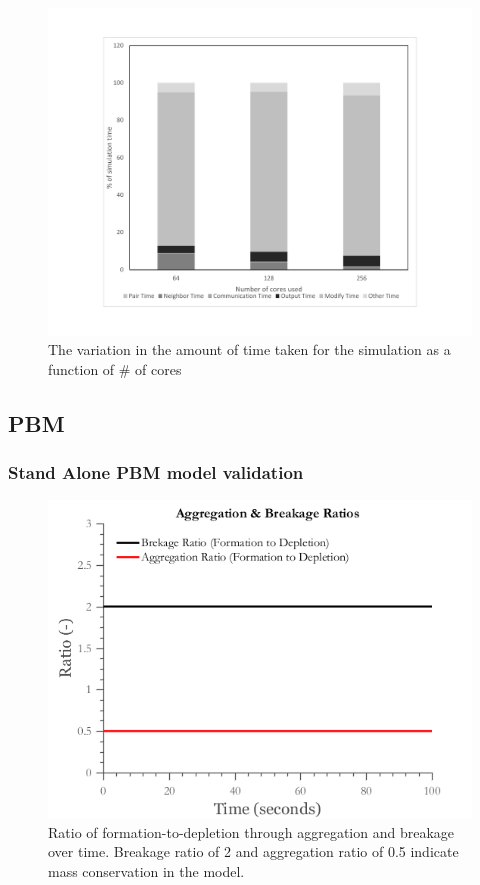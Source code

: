 \documentclass[preprint,11pt,authoryear]{elsarticle}
\begin{document}
\begin{figure}[H]
\centering
\includegraphics[scale=0.5]{rslts_DEM_percent_plot.pdf}
\caption{The variation in the amount of time taken for the simulation as a function of \# of cores}
\label{fig:rslts_DEM_percent_plot}
\end{figure}


\subsection{PBM}

\subsubsection{Stand Alone PBM model validation}


\begin{figure}[H]
\centering
\includegraphics[scale=0.5]{rslts_anik_pbm_ratios}
\caption{Ratio of formation-to-depletion through aggregation and breakage over time. Breakage ratio of 2 and aggregation ratio of 0.5 indicate mass conservation in the model. }
\label{fig:rslts_anik_pbm_ratios}
\end{figure}
\end{document}
